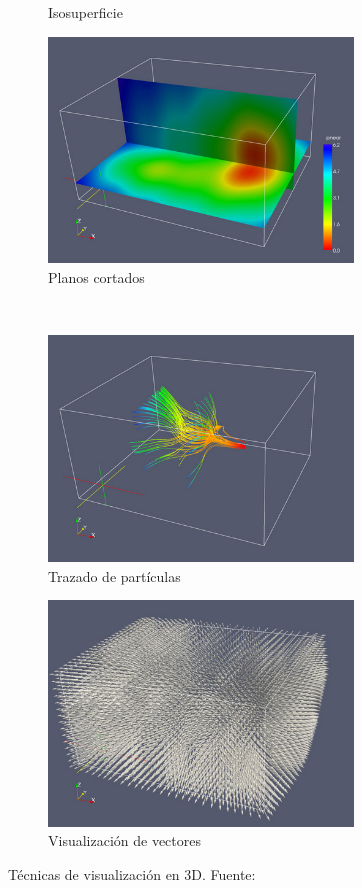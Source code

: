 \begin{figure}[t]
\begin{subfigure}[b]{.45\textwidth}
			\caption{Isosuperficie}
			\label{fig:isosurface}
	\end{subfigure} \hfill
	\begin{subfigure}[b]{.45\textwidth}
			\includegraphics[height=6cm,width=\textwidth]{figures/sliceplanes.jpg}
			\caption{Planos cortados}
			\label{fig:sliceplanes}
	\end{subfigure}
	\newline\\
	\begin{subfigure}[b]{.45\textwidth}
			\includegraphics[height=6cm,width=\textwidth]{figures/particletracing.jpg}
			\caption{Trazado de partículas}
			\label{fig:particletracing}
	\end{subfigure} \hfill
	\begin{subfigure}[b]{.45\textwidth}
			\includegraphics[height=6cm,width=\textwidth]{figures/vectorvisualization.jpg}
			\caption{Visualización de vectores}
			\label{fig:vectorvisualization}
	\end{subfigure}
	\caption[Técnicas de visualización en 3D.]{Técnicas de visualización en 3D. Fuente:~\cite{3dimages}}
	\label{fig:3dvis}
\end{figure}

